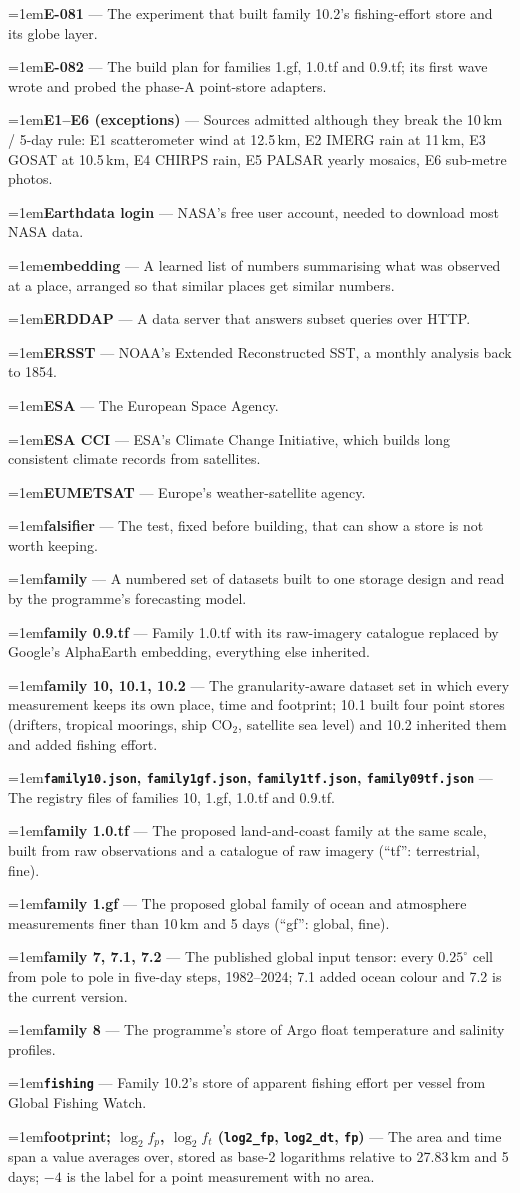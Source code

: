 \documentclass[10pt]{article}
\newcommand{\code}[1]{\texttt{#1}}
\newcommand{\gl}[2]{\par\hangindent=1em\hangafter=1\textbf{#1} --- #2\par}
\begin{document}
\gl{E-081}{The experiment that built family 10.2's fishing-effort store and its globe layer.}
\gl{E-082}{The build plan for families 1.gf, 1.0.tf and 0.9.tf; its first wave wrote and probed the phase-A point-store adapters.}
\gl{E1--E6 (exceptions)}{Sources admitted although they break the 10\,km / 5-day rule: E1 scatterometer wind at 12.5\,km, E2 IMERG rain at 11\,km, E3 GOSAT at 10.5\,km, E4 CHIRPS rain, E5 PALSAR yearly mosaics, E6 sub-metre photos.}
\gl{Earthdata login}{NASA's free user account, needed to download most NASA data.}
\gl{embedding}{A learned list of numbers summarising what was observed at a place, arranged so that similar places get similar numbers.}
\gl{ERDDAP}{A data server that answers subset queries over HTTP.}
\gl{ERSST}{NOAA's Extended Reconstructed SST, a monthly analysis back to 1854.}
\gl{ESA}{The European Space Agency.}
\gl{ESA CCI}{ESA's Climate Change Initiative, which builds long consistent climate records from satellites.}
\gl{EUMETSAT}{Europe's weather-satellite agency.}
\gl{falsifier}{The test, fixed before building, that can show a store is not worth keeping.}
\gl{family}{A numbered set of datasets built to one storage design and read by the programme's forecasting model.}
\gl{family 0.9.tf}{Family 1.0.tf with its raw-imagery catalogue replaced by Google's AlphaEarth embedding, everything else inherited.}
\gl{family 10, 10.1, 10.2}{The granularity-aware dataset set in which every measurement keeps its own place, time and footprint; 10.1 built four point stores (drifters, tropical moorings, ship CO$_2$, satellite sea level) and 10.2 inherited them and added fishing effort.}
\gl{\code{family10.json}, \code{family1gf.json}, \code{family1tf.json}, \code{family09tf.json}}{The registry files of families 10, 1.gf, 1.0.tf and 0.9.tf.}
\gl{family 1.0.tf}{The proposed land-and-coast family at the same scale, built from raw observations and a catalogue of raw imagery (``tf'': terrestrial, fine).}
\gl{family 1.gf}{The proposed global family of ocean and atmosphere measurements finer than 10\,km and 5 days (``gf'': global, fine).}
\gl{family 7, 7.1, 7.2}{The published global input tensor: every $0.25^\circ$ cell from pole to pole in five-day steps, 1982--2024; 7.1 added ocean colour and 7.2 is the current version.}
\gl{family 8}{The programme's store of Argo float temperature and salinity profiles.}
\gl{\code{fishing}}{Family 10.2's store of apparent fishing effort per vessel from Global Fishing Watch.}
\gl{footprint; $\log_2 f_p$, $\log_2 f_t$ (\code{log2\_fp}, \code{log2\_dt}, \code{fp})}{The area and time span a value averages over, stored as base-2 logarithms relative to 27.83\,km and 5 days; $-4$ is the label for a point measurement with no area.}
\end{document}
